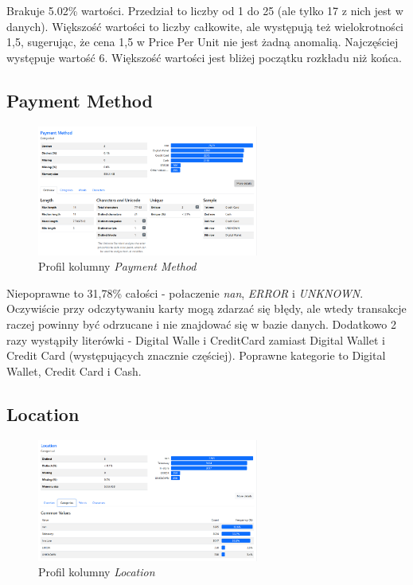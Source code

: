 \documentclass[a4paper,12pt]{article}
\begin{document}
Brakuje 5.02\% wartości. Przedział to liczby od 1 do 25 (ale tylko 17 z nich jest w danych). Większość wartości to liczby całkowite, ale występują też wielokrotności 1,5, sugerując, że cena 1,5 w Price Per Unit nie jest żadną anomalią. Najczęściej występuje wartość 6. Większość wartości jest bliżej początku rozkładu niż końca.

\subsection{Payment Method}

\begin{figure}[H]
  \centering
  \includegraphics[width=0.65\textwidth]{images/py_6.png}
  \caption{Profil kolumny \textit{Payment Method}}
\end{figure}

Niepoprawne to 31,78\% całości - połaczenie \textit{nan}, \textit{ERROR} i \textit{UNKNOWN}. Oczywiście przy odczytywaniu karty mogą zdarzać się błędy, ale wtedy transakcje raczej powinny być odrzucane i nie znajdować się w bazie danych. Dodatkowo 2 razy wystąpiły literówki - Digital Walle i CreditCard zamiast Digital Wallet i Credit Card (występujących znacznie częściej). Poprawne kategorie to Digital Wallet, Credit Card	i Cash.

\subsection{Location}

\begin{figure}[H]
  \centering
  \includegraphics[width=0.65\textwidth]{images/py_7.png}
  \caption{Profil kolumny \textit{Location}}
\end{figure}
\end{document}
